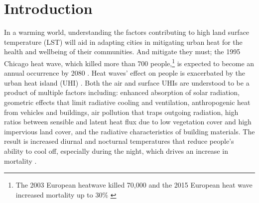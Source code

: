 \documentclass[final,3p,times,onecolumn,sort&compress]{elsarticle}
\begin{document}

\section{Introduction}
In a warming world, understanding the factors contributing to high land surface temperature (LST) will aid in adapting cities in mitigating urban heat for the health and wellbeing of their communities.
And mitigate they must; the 1995 Chicago heat wave, which killed more than 700 people,\footnote{The 2003 European heatwave killed 70,000 \citep{Robine2008-ky} and the 2015 European heat wave increased mortality up to 30\% \citep{Vicedo-Cabrera2016-si}} is expected to become an annual occurrence by 2080 \citep{klinenberg2015heat}. 
Heat waves' effect on people is exacerbated by the urban heat island (UHI) \citep{Wicki2017-fv, Echevarria_Icaza2016-fr}.
Both the air and surface UHIs are understood to be a product of multiple factors including: enhanced absorption of solar radiation, geometric effects that limit radiative cooling and ventilation, anthropogenic heat from vehicles and buildings, air pollution that traps outgoing radiation, high ratios between sensible and latent heat flux due to low vegetation cover and high impervious land cover, and the radiative characteristics of building materials. %
The result is increased diurnal and nocturnal temperatures that reduce people's ability to cool off, especially during the night, which drives an increase in mortality \citep{Echevarria_Icaza2016-fr, Murage2017-wj}.
\end{document}
